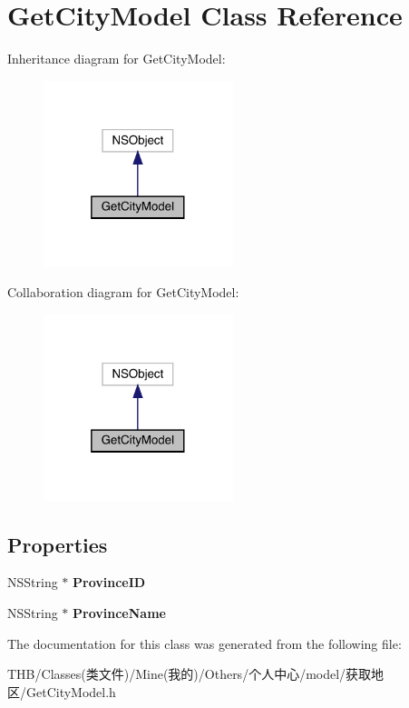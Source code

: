 \hypertarget{interface_get_city_model}{}\section{Get\+City\+Model Class Reference}
\label{interface_get_city_model}


Inheritance diagram for Get\+City\+Model\+:\nopagebreak
\begin{figure}[H]
\begin{center}
\leavevmode
\includegraphics[width=157pt]{interface_get_city_model__inherit__graph}
\end{center}
\end{figure}


Collaboration diagram for Get\+City\+Model\+:\nopagebreak
\begin{figure}[H]
\begin{center}
\leavevmode
\includegraphics[width=157pt]{interface_get_city_model__coll__graph}
\end{center}
\end{figure}
\subsection*{Properties}
\begin{DoxyCompactItemize}
\item 
\mbox{\label{interface_get_city_model_a20c2f6a19af4e65706e37863462529b2}} 
N\+S\+String $\ast$ {\bfseries Province\+ID}
\item 
\mbox{\label{interface_get_city_model_a1f2c62dae3e15b804a63f5d45e2804a3}} 
N\+S\+String $\ast$ {\bfseries Province\+Name}
\end{DoxyCompactItemize}


The documentation for this class was generated from the following file\+:\begin{DoxyCompactItemize}
\item 
T\+H\+B/\+Classes(类文件)/\+Mine(我的)/\+Others/个人中心/model/获取地区/Get\+City\+Model.\+h\end{DoxyCompactItemize}
